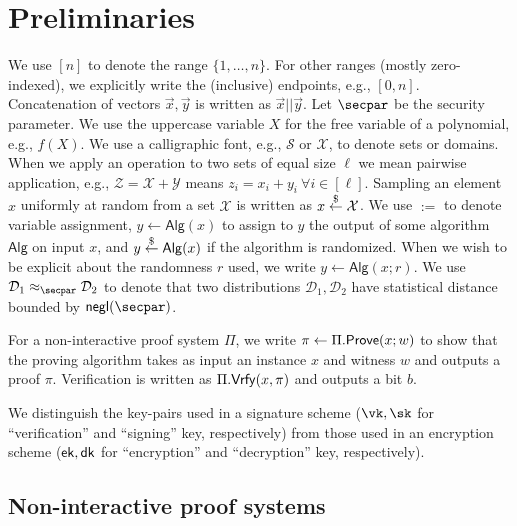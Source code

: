 \section{Preliminaries}\label{sec:prelims}

We use $[n]$ to denote the range $\{1, \dots, n\}$. For other ranges (mostly zero-indexed), we explicitly write the (inclusive) endpoints, e.g., $[0,n]$. 
Concatenation of vectors $\vec{x},\vec{y}$ is written as $\vec{x} || \vec{y}$. 
Let $\secpar$ be the security parameter.
We use the uppercase variable $X$ for the free variable of a polynomial, e.g., $f(X)$. 
We use a calligraphic font, e.g., $\mathcal{S}$ or $\mathcal{X}$, to denote sets or domains. When we apply an operation to two sets of equal size $\ell$ we mean pairwise application, e.g., $\mathcal{Z} = \mathcal{X} + \mathcal{Y}$ means $z_i = x_i + y_i~\forall{i \in [\ell]}$. 
Sampling an element $x$ uniformly at random from a set $\mathcal{X}$ is written as $x \stackrel{\$}{\gets} \mathcal{X}$. 
We use $:=$ to denote variable assignment, $y \gets \mathsf{Alg}(x)$ to assign to $y$ the output of some algorithm $\mathsf{Alg}$ on input $x$, and $y \stackrel{\$}{\gets} \mathsf{Alg}(x)$ if the algorithm is randomized. When we wish to be explicit about the randomness $r$ used, we write $y \gets \mathsf{Alg}(x; r)$. We use $\mathcal{D}_1 \approx_\secpar \mathcal{D}_2$ to denote that two distributions $\mathcal{D}_1, \mathcal{D}_2$ have statistical distance bounded by $\negl$.

For a non-interactive proof system $\Pi$, we write $\pi \gets \Pi.\mathsf{Prove}(x; w)$ to show that the proving algorithm takes as input an instance $x$ and witness $w$ and outputs a proof $\pi$. Verification is written as $\Pi.\mathsf{Vrfy}(x, \pi)$ and outputs a bit $b$. 

We distinguish the key-pairs used in a signature scheme ($\vk, \sk$ for ``verification'' and ``signing'' key, respectively) from those used in an encryption scheme ($\mathsf{ek}, \mathsf{dk}$ for ``encryption'' and ``decryption'' key, respectively). 

\subsection{Non-interactive proof systems}\label{sec:nizks}


